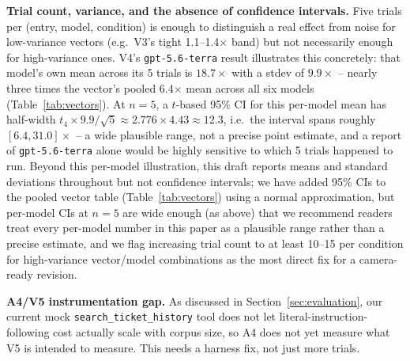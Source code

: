 \documentclass[conference]{IEEEtran}
\begin{document}
\textbf{Trial count, variance, and the absence of confidence intervals.} Five trials per (entry, model, condition) is enough to distinguish a real effect from noise for low-variance vectors (e.g.\ V3's tight 1.1--1.4$\times$ band) but not necessarily enough for high-variance ones. V4's \texttt{gpt-5.6-terra} result illustrates this concretely: that model's own mean across its 5 trials is $18.7\times$ with a stdev of $9.9\times$ -- nearly three times the vector's pooled 6.4$\times$ mean across all six models (Table~\ref{tab:vectors}). At $n=5$, a $t$-based 95\% CI for this per-model mean has half-width $t_{4}\times 9.9/\sqrt{5}\approx 2.776\times 4.43\approx 12.3$, i.e.\ the interval spans roughly $[6.4,31.0]\times$ -- a wide plausible range, not a precise point estimate, and a report of \texttt{gpt-5.6-terra} alone would be highly sensitive to which 5 trials happened to run. Beyond this per-model illustration, this draft reports means and standard deviations throughout but not confidence intervals; we have added 95\% CIs to the pooled vector table (Table~\ref{tab:vectors}) using a normal approximation, but per-model CIs at $n=5$ are wide enough (as above) that we recommend readers treat every per-model number in this paper as a plausible range rather than a precise estimate, and we flag increasing trial count to at least 10--15 per condition for high-variance vector/model combinations as the most direct fix for a camera-ready revision.

\textbf{A4/V5 instrumentation gap.} As discussed in Section~\ref{sec:evaluation}, our current mock \texttt{search\_ticket\_history} tool does not let literal-instruction-following cost actually scale with corpus size, so A4 does not yet measure what V5 is intended to measure. This needs a harness fix, not just more trials.
\end{document}
